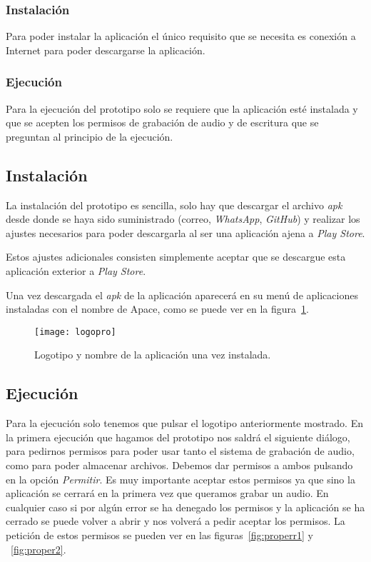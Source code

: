 \subsubsection{Instalación}
Para poder instalar la aplicación el único requisito que se necesita es conexión a Internet para poder descargarse la aplicación.

\subsubsection{Ejecución}
Para la ejecución del prototipo solo se requiere que la aplicación esté instalada y que se acepten los permisos de grabación de audio y de escritura que se preguntan al principio de la ejecución.

\subsection{Instalación}
La instalación del prototipo es sencilla, solo hay que descargar el archivo \textit{apk} desde donde se haya sido suministrado (correo, \textit{WhatsApp}, \textit{GitHub}) y realizar los ajustes necesarios para poder descargarla al ser una aplicación ajena a \textit{Play Store}.

Estos ajustes adicionales consisten simplemente aceptar que se descargue esta aplicación exterior a \textit{Play Store}.

Una vez descargada el \textit{apk} de la aplicación aparecerá en su menú de aplicaciones instaladas con el nombre de Apace, como se puede ver en la figura~\ref{fig:logopro}.

\begin{figure}[H]
	\centering
	\texttt{[image: logopro]}
	\caption{Logotipo y nombre de la aplicación una vez instalada.}
	\label{fig:logopro}
\end{figure}

\subsection{Ejecución}
Para la ejecución solo tenemos que pulsar el logotipo anteriormente mostrado. En la primera ejecución que hagamos del prototipo nos saldrá el siguiente diálogo, para pedirnos permisos para poder usar tanto el sistema de grabación de audio, como para poder almacenar archivos. Debemos dar permisos a ambos pulsando en la opción \textit{Permitir}. Es muy importante aceptar estos permisos ya que sino la aplicación se cerrará en la primera vez que queramos grabar un audio. En cualquier caso si por algún error se ha denegado los permisos y la aplicación se ha cerrado se puede volver a abrir y nos volverá a pedir aceptar los permisos. La petición de estos permisos se pueden ver en las figuras~\ref{fig:properr1} y ~\ref{fig:proper2}.

